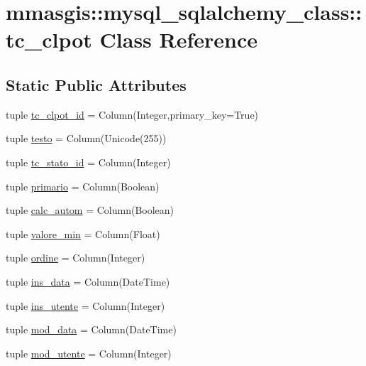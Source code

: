 \hypertarget{classmmasgis_1_1mysql__sqlalchemy__class_1_1tc__clpot}{
\section{mmasgis::mysql\_\-sqlalchemy\_\-class::tc\_\-clpot Class Reference}
\label{classmmasgis_1_1mysql__sqlalchemy__class_1_1tc__clpot}
}
\subsection*{Static Public Attributes}
\begin{DoxyCompactItemize}
\item 
tuple \hyperlink{classmmasgis_1_1mysql__sqlalchemy__class_1_1tc__clpot_a8da949e994523a4c1eef42085072985f}{tc\_\-clpot\_\-id} = Column(Integer,primary\_\-key=True)
\item 
tuple \hyperlink{classmmasgis_1_1mysql__sqlalchemy__class_1_1tc__clpot_a7a28f1889e0e6d6dd6bd7ec3cbb22da7}{testo} = Column(Unicode(255))
\item 
tuple \hyperlink{classmmasgis_1_1mysql__sqlalchemy__class_1_1tc__clpot_a0ace5ee65b7cf896485d6784484eff9a}{tc\_\-stato\_\-id} = Column(Integer)
\item 
tuple \hyperlink{classmmasgis_1_1mysql__sqlalchemy__class_1_1tc__clpot_ac0055b8df65d6ef59351db566e18d122}{primario} = Column(Boolean)
\item 
tuple \hyperlink{classmmasgis_1_1mysql__sqlalchemy__class_1_1tc__clpot_a216e67715468109055e5792e45a025f0}{calc\_\-autom} = Column(Boolean)
\item 
tuple \hyperlink{classmmasgis_1_1mysql__sqlalchemy__class_1_1tc__clpot_ab00079f34a9d722244310a3ee938e5a6}{valore\_\-min} = Column(Float)
\item 
tuple \hyperlink{classmmasgis_1_1mysql__sqlalchemy__class_1_1tc__clpot_a64b5d2e94029c8b18367f74eb734168d}{ordine} = Column(Integer)
\item 
tuple \hyperlink{classmmasgis_1_1mysql__sqlalchemy__class_1_1tc__clpot_a6326e18231afeb88260f4a0604620dee}{ins\_\-data} = Column(DateTime)
\item 
tuple \hyperlink{classmmasgis_1_1mysql__sqlalchemy__class_1_1tc__clpot_a7036a3646153a28107ed3f9455503253}{ins\_\-utente} = Column(Integer)
\item 
tuple \hyperlink{classmmasgis_1_1mysql__sqlalchemy__class_1_1tc__clpot_a85d1660bc9c9eeea9986432a63a903f5}{mod\_\-data} = Column(DateTime)
\item 
tuple \hyperlink{classmmasgis_1_1mysql__sqlalchemy__class_1_1tc__clpot_a26d341800ed44ff88493e1b9581b2bf4}{mod\_\-utente} = Column(Integer)
\end{DoxyCompactItemize}
